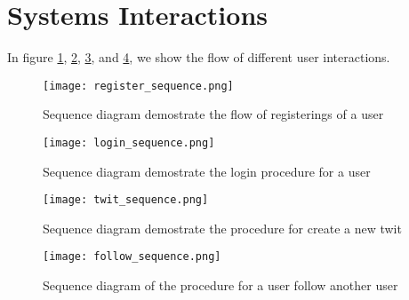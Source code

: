 \section{Systems Interactions}

%
In figure \ref{fig:register_sequence}, \ref{fig:login_sequence}, \ref{fig:twit_sequence}, and \ref{fig:follow_sequence}, we show the flow of different user interactions.

\begin{figure}[H]
	\centering
	\texttt{[image: register\_sequence.png]}
	\caption{Sequence diagram demostrate the flow of registerings of a user}
	\label{fig:register_sequence}
\end{figure}


\begin{figure}[H]
	\centering
	\texttt{[image: login\_sequence.png]}
	\caption{Sequence diagram demostrate the login procedure for a user}
	\label{fig:login_sequence}
\end{figure}

\begin{figure}[H]
	\centering
	\texttt{[image: twit\_sequence.png]}
	\caption{Sequence diagram demostrate the procedure for create a new twit}
	\label{fig:twit_sequence}
\end{figure}

\begin{figure}[H]
	\centering
	\texttt{[image: follow\_sequence.png]}
	\caption{Sequence diagram of the procedure for a user follow another user}
	\label{fig:follow_sequence}
\end{figure}

